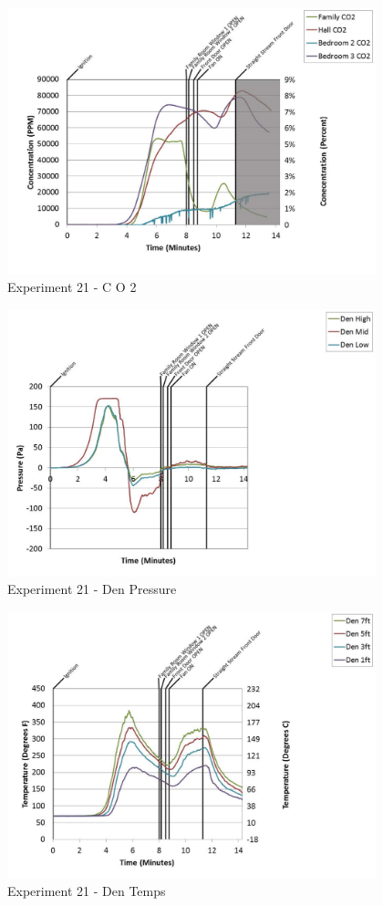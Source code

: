 \documentclass{article}
\begin{document}
\begin{appendices}
	\begin{figure}[h!]
		\centering
		\includegraphics[height=3.05in]{0_Images/Results_Charts/Exp_21_Charts/CO2.pdf}
		\caption{Experiment 21 - C O 2}
	\end{figure}
 
	\clearpage

	\begin{figure}[h!]
		\centering
		\includegraphics[height=3.05in]{0_Images/Results_Charts/Exp_21_Charts/DenPressure.pdf}
		\caption{Experiment 21 - Den Pressure}
	\end{figure}
 

	\begin{figure}[h!]
		\centering
		\includegraphics[height=3.05in]{0_Images/Results_Charts/Exp_21_Charts/DenTemps.pdf}
		\caption{Experiment 21 - Den Temps}
	\end{figure}
 

\end{appendices}
\end{document}
